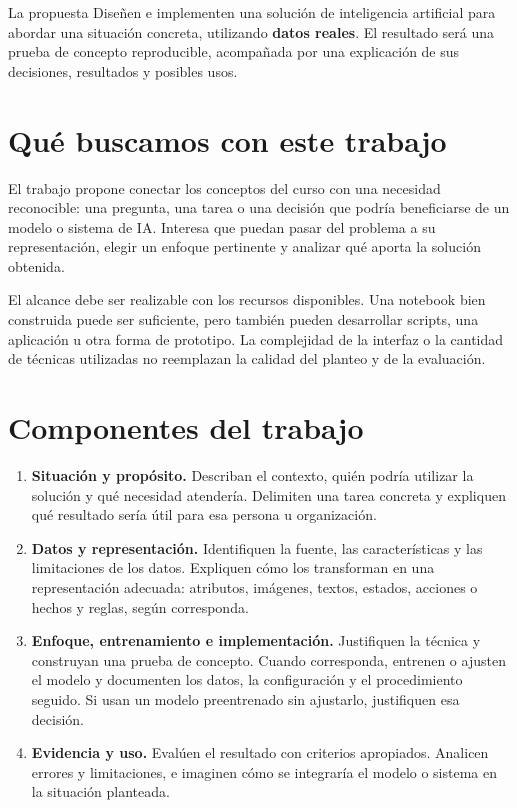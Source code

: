 \documentclass[11pt,a4paper]{article}
\begin{document}

\begin{destacado}{La propuesta}
Diseñen e implementen una solución de inteligencia artificial para abordar una situación concreta, utilizando \textbf{datos reales}. El resultado será una prueba de concepto reproducible, acompañada por una explicación de sus decisiones, resultados y posibles usos.
\end{destacado}

\section*{Qué buscamos con este trabajo}
El trabajo propone conectar los conceptos del curso con una necesidad reconocible: una pregunta, una tarea o una decisión que podría beneficiarse de un modelo o sistema de IA. Interesa que puedan pasar del problema a su representación, elegir un enfoque pertinente y analizar qué aporta la solución obtenida.

El alcance debe ser realizable con los recursos disponibles. Una notebook bien construida puede ser suficiente, pero también pueden desarrollar scripts, una aplicación u otra forma de prototipo. La complejidad de la interfaz o la cantidad de técnicas utilizadas no reemplazan la calidad del planteo y de la evaluación.

\section*{Componentes del trabajo}
\begin{enumerate}
\item \textbf{Situación y propósito.} Describan el contexto, quién podría utilizar la solución y qué necesidad atendería. Delimiten una tarea concreta y expliquen qué resultado sería útil para esa persona u organización.
\item \textbf{Datos y representación.} Identifiquen la fuente, las características y las limitaciones de los datos. Expliquen cómo los transforman en una representación adecuada: atributos, imágenes, textos, estados, acciones o hechos y reglas, según corresponda.
\item \textbf{Enfoque, entrenamiento e implementación.} Justifiquen la técnica y construyan una prueba de concepto. Cuando corresponda, entrenen o ajusten el modelo y documenten los datos, la configuración y el procedimiento seguido. Si usan un modelo preentrenado sin ajustarlo, justifiquen esa decisión.
\item \textbf{Evidencia y uso.} Evalúen el resultado con criterios apropiados. Analicen errores y limitaciones, e imaginen cómo se integraría el modelo o sistema en la situación planteada.
\end{enumerate}
\end{document}
